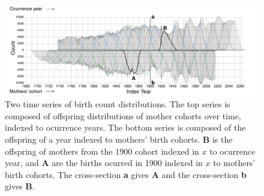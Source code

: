 \documentclass{article}
\begin{document}
\begin{figure}[ht!]
 \centering
        \includegraphics[width=\textwidth]{Figures/FxFlowReflect.pdf}
        \caption{Two time series of birth count distributions. The top series is composed of offspring distributions of mother cohorts over time, indexed to ocurrence years. The bottom series is composed of the offspring of a year indexed to mothers' birth cohorts. \textbf{B} is the offspring of mothers from the 1900 cohort indexed in $x$ to ocurrence year, and \textbf{A} are the births ocurred in 1900 indexed in $x$ to mothers' birth cohorts. The cross-section \textbf{a} gives \textbf{A} and the cross-section \textbf{b} gives \textbf{B}.}
          \label{fig:reflect1}
\end{figure}
\end{document}
